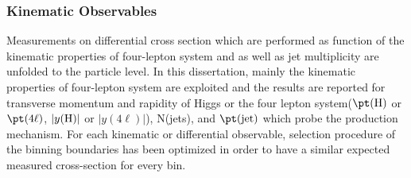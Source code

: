 \subsubsection{Kinematic Observables} \label{sec:KinematicObservables}

Measurements on differential cross section which are performed as function of the kinematic properties of four-lepton system and as well as  jet multiplicity are unfolded to the particle level.
In this dissertation, mainly the kinematic properties of four-lepton system are exploited and the results are reported for transverse momentum and
rapidity of Higgs or the four lepton system($\pt({\rm H})$ or $\pt(4\ell)$, $|y({\rm H})|$ or $|y(4\ell)|$), N(jets), and $\pt({\rm jet})$ which probe the production mechanism.
For each kinematic or differential observable, selection procedure of the binning boundaries has been optimized in order to have a similar expected measured cross-section for every bin.

